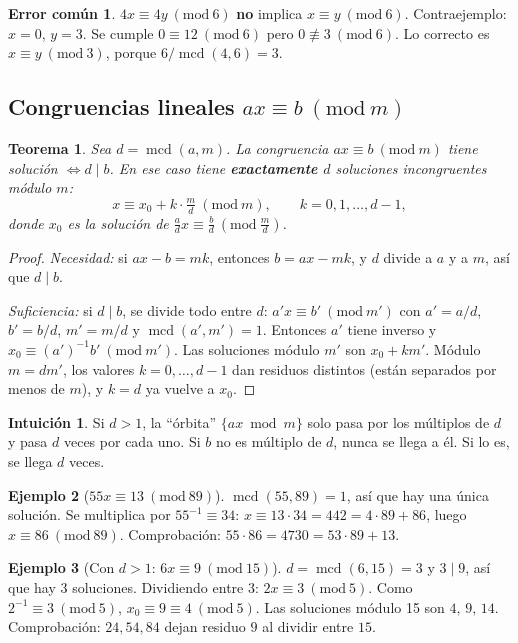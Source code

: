 \documentclass[11pt,a4paper]{article}
\newtheorem{teorema}{Teorema}[section]
\theoremstyle{definition}
\newtheorem{ejemplo}[teorema]{Ejemplo}
\newcommand{\md}[1]{\ (\mathrm{mod}\ #1)}
\newcommand{\mcd}{\operatorname{mcd}}
\theoremstyle{notait}
\theoremstyle{nota}
\newtheorem*{intuicion}{Intuición}
\newtheorem*{trampaX}{Error común}
\newenvironment{trampa}{\begin{trampaX}\leavevmode\marginpar{\raggedleft\vspace*{-0.9\baselineskip}\dbend}\ignorespaces}{\end{trampaX}}
\begin{document}
\begin{trampa}
$4x\equiv4y\md 6$ \textbf{no} implica $x\equiv y\md6$. Contraejemplo: $x=0$, $y=3$. Se cumple $0\equiv12\md 6$ pero $0\not\equiv3\md6$. Lo correcto es $x\equiv y\md 3$, porque $6/\mcd(4,6)=3$.
\end{trampa}

\subsection{Congruencias lineales $ax\equiv b\md m$}

\begin{teorema}
Sea $d=\mcd(a,m)$. La congruencia $ax\equiv b\md m$ tiene solución $\iff d\mid b$. En ese caso tiene \textbf{exactamente $d$} soluciones incongruentes módulo $m$:
\[
x\equiv x_0+k\cdot\tfrac{m}{d}\md m,\qquad k=0,1,\dots,d-1,
\]
donde $x_0$ es la solución de $\tfrac ad x\equiv\tfrac bd\md{\tfrac md}$.
\end{teorema}
\begin{proof}
\emph{Necesidad:} si $ax-b=mk$, entonces $b=ax-mk$, y $d$ divide a $a$ y a $m$, así que $d\mid b$.

\emph{Suficiencia:} si $d\mid b$, se divide todo entre $d$: $a'x\equiv b'\md{m'}$ con $a'=a/d$, $b'=b/d$, $m'=m/d$ y $\mcd(a',m')=1$. Entonces $a'$ tiene inverso y $x_0\equiv (a')^{-1}b'\md{m'}$. Las soluciones módulo $m'$ son $x_0+km'$. Módulo $m=dm'$, los valores $k=0,\dots,d-1$ dan residuos distintos (están separados por menos de $m$), y $k=d$ ya vuelve a $x_0$.
\end{proof}

\begin{intuicion}
Si $d>1$, la ``órbita'' $\{ax \bmod m\}$ solo pasa por los múltiplos de $d$ y pasa $d$ veces por cada uno. Si $b$ no es múltiplo de $d$, nunca se llega a él. Si lo es, se llega $d$ veces.
\end{intuicion}

\begin{ejemplo}[$55x\equiv13\md{89}$]
$\mcd(55,89)=1$, así que hay una única solución. Se multiplica por $55^{-1}\equiv34$: $x\equiv13\cdot34=442=4\cdot89+86$, luego $x\equiv86\md{89}$. Comprobación: $55\cdot86=4730=53\cdot89+13$.
\end{ejemplo}

\begin{ejemplo}[Con $d>1$: $6x\equiv9\md{15}$]
$d=\mcd(6,15)=3$ y $3\mid9$, así que hay 3 soluciones. Dividiendo entre 3: $2x\equiv3\md5$. Como $2^{-1}\equiv3\md 5$, $x_0\equiv9\equiv4\md5$. Las soluciones módulo 15 son $4,\,9,\,14$. Comprobación: $24,54,84$ dejan residuo $9$ al dividir entre $15$.
\end{ejemplo}
\end{document}
